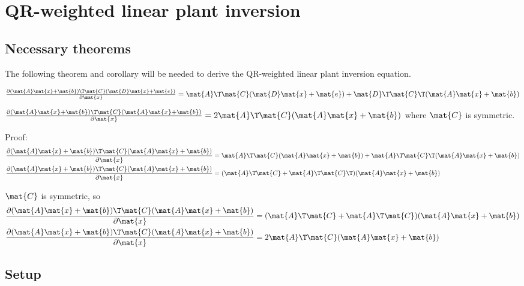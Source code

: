 
\chapter{QR-weighted linear plant inversion}

\section{Necessary theorems}

The following theorem and corollary will be needed to derive the QR-weighted
linear plant inversion equation.
\begin{theorem}
  $\frac{\partial (\mat{A}\mat{x} + \mat{b})\T\mat{C}
    (\mat{D}\mat{x} + \mat{e})}{\partial\mat{x}} =
    \mat{A}\T\mat{C}(\mat{D}\mat{x} + \mat{e}) + \mat{D}\T\mat{C}\T
    (\mat{A}\mat{x} + \mat{b})$
\end{theorem}
\begin{corollary}
  \label{cor:partial_ax_b}

  $\frac{\partial (\mat{A}\mat{x} + \mat{b})\T\mat{C}
    (\mat{A}\mat{x} + \mat{b})}{\partial\mat{x}} =
    2\mat{A}\T\mat{C}(\mat{A}\mat{x} + \mat{b})$ where $\mat{C}$ is symmetric.

  Proof:
  \begin{align*}
    \frac{\partial (\mat{A}\mat{x} + \mat{b})\T\mat{C}
      (\mat{A}\mat{x} + \mat{b})}{\partial\mat{x}} &=
      \mat{A}\T\mat{C}(\mat{A}\mat{x} + \mat{b}) + \mat{A}\T\mat{C}\T
      (\mat{A}\mat{x} + \mat{b}) \\
    \frac{\partial (\mat{A}\mat{x} + \mat{b})\T\mat{C}
      (\mat{A}\mat{x} + \mat{b})}{\partial\mat{x}} &=
      (\mat{A}\T\mat{C} + \mat{A}\T\mat{C}\T)(\mat{A}\mat{x} + \mat{b})
  \end{align*}

  $\mat{C}$ is symmetric, so
  \begin{align*}
    \frac{\partial (\mat{A}\mat{x} + \mat{b})\T\mat{C}
      (\mat{A}\mat{x} + \mat{b})}{\partial\mat{x}} &=
      (\mat{A}\T\mat{C} + \mat{A}\T\mat{C})(\mat{A}\mat{x} + \mat{b}) \\
    \frac{\partial (\mat{A}\mat{x} + \mat{b})\T\mat{C}
      (\mat{A}\mat{x} + \mat{b})}{\partial\mat{x}} &=
      2\mat{A}\T\mat{C}(\mat{A}\mat{x} + \mat{b})
  \end{align*}
\end{corollary}

\section{Setup}

